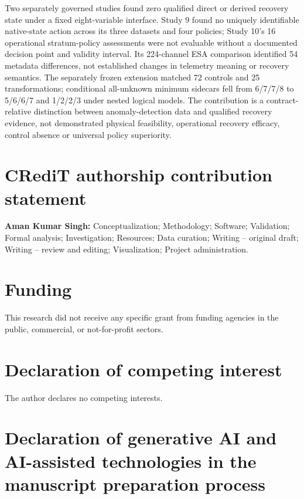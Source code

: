 \documentclass[preprint,12pt]{elsarticle}
\begin{document}
Two separately governed studies found zero qualified direct or derived recovery state under a fixed eight-variable interface. Study 9 found no uniquely identifiable native-state action across its three datasets and four policies; Study 10's 16 operational stratum-policy assessments were not evaluable without a documented decision point and validity interval. Its 224-channel ESA comparison identified 54 metadata differences, not established changes in telemetry meaning or recovery semantics. The separately frozen extension matched 72 controls and 25 transformations; conditional all-unknown minimum sidecars fell from 6/7/7/8 to 5/6/6/7 and 1/2/2/3 under nested logical models. The contribution is a contract-relative distinction between anomaly-detection data and qualified recovery evidence, not demonstrated physical feasibility, operational recovery efficacy, control absence or universal policy superiority.

\section*{CRediT authorship contribution statement}

\textbf{Aman Kumar Singh:} Conceptualization; Methodology; Software; Validation; Formal analysis; Investigation; Resources; Data curation; Writing -- original draft; Writing -- review and editing; Visualization; Project administration.

\section*{Funding}

This research did not receive any specific grant from funding agencies in the public, commercial, or not-for-profit sectors.

\section*{Declaration of competing interest}

The author declares no competing interests.

\section*{Declaration of generative AI and AI-assisted technologies in the manuscript preparation process}
\end{document}
